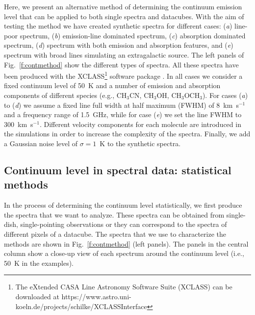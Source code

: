 \documentclass{aa}
\begin{document}
Here, we present an alternative method of determining the continuum emission level that can be applied to both single spectra and datacubes. With the aim of testing the method we have created synthetic spectra for different cases: (\textit{a}) line-poor spectrum, (\textit{b}) emission-line dominated spectrum, (\textit{c}) absorption dominated spectrum, (\textit{d}) spectrum with both emission and absorption features, and (\textit{e}) spectrum with broad lines simulating an extragalactic source. The left panels of Fig.~\ref{f:contmethod} show the different types of spectra. All these spectra have been produced with the XCLASS\footnote{The eXtended CASA Line Astronomy Software Suite (XCLASS) can be downloaded at https://www.astro.uni-koeln.de/projects/schilke/XCLASSInterface} software package \citep{Moeller2017}. In all cases we consider a fixed continuum level of 50~K and a number of emission and absorption components of different species (e.g., CH$_3$CN, CH$_3$OH, CH$_3$OCH$_3$). For cases (\textit{a}) to (\textit{d}) we assume a fixed line full width at half maximum (FWHM) of 8~km~s$^{-1}$ and a frequency range of 1.5~GHz, while for case (\textit{e}) we set the line FWHM to 300~km~s$^{-1}$. Different velocity components for each molecule are introduced in the simulations in order to increase the complexity of the spectra. Finally, we add a Gaussian noise level of $\sigma=1$~K to the synthetic spectra.

\subsection{Continuum level in spectral data: statistical methods}\label{s:contspectra}

In the process of determining the continuum level statistically, we first produce the spectra that we want to analyze. These spectra can be obtained from single-dish, single-pointing observations or they can correspond to the spectra of different pixels of a datacube. The spectra that we use to characterize the methods are shown in Fig.~\ref{f:contmethod} (left panels). The panels in the central column show a close-up view of each spectrum around the continuum level (i.e., 50~K in the examples).
\end{document}
